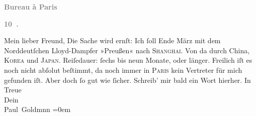 \begin{ledgroupsized}[t]{13cm}
           \pstart
           \begin{otherlanguage}{french}\textcolor{gray}{\textbf{\textbf{Bureau à Paris}}}\end{otherlanguage}\pend
           \pstart
           \begin{otherlanguage}{french}\textcolor{gray}{\textbf{\textbf{10 .}}}\end{otherlanguage}\pend
           \pstart\center{}Mein lieber Freund,\pend\pstart
           Die Sache wird ernſt: Ich ſoll Ende März mit dem Norddeutſchen Lloyd-Dampfer »Preußen« nach \textsc{Shanghai}. Von da durch China, \textsc{Korea} und \textsc{Japan}. Reiſedauer: ſechs bis neun Monate, oder länger. Freilich iſt es noch nicht
               abſolut beſtimmt, da noch immer in \textsc{Paris} kein Vertreter für mich gefunden iſt. Aber doch ſo gut wie ſicher. Schreib’ mir
               bald ein Wort hierher.\pend
           \pstart
           In Treue {\\[\baselineskip]}Dein {\\[\baselineskip]}\spacefill\mbox{Paul Goldmnn}\pend
           \leftskip=0em{}
         
         \endnumbering{}\end{ledgroupsized}  \newcommand{\dateiname}{L02840}\newcommand{\titel}{Paul Goldmann an Arthur Schnitzler, 2. 3. [1898]}\newcommand{\editorInnen}{Martin Anton Müller und Laura Untner}
      
